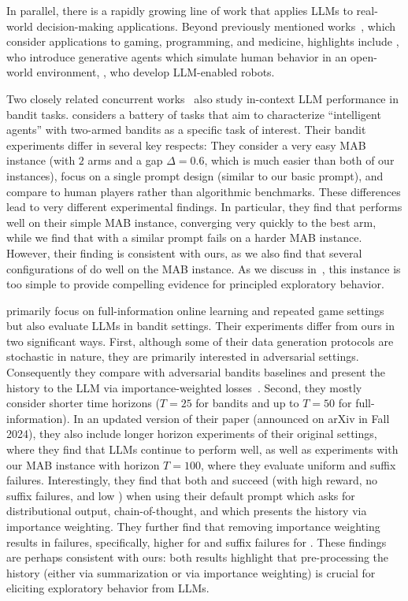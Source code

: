 In parallel, there is a rapidly growing line of work that applies LLMs to real-world decision-making applications. Beyond previously mentioned works~\citep{shinn2023reflexion,wang2023voyager,lee2023ai}, which consider applications to gaming, programming, and medicine, highlights include \citet{park2023generative}, who introduce generative agents which simulate human behavior in an open-world environment, \citet{ahn2022can,xu2023creative}, who develop LLM-enabled robots.



Two closely related concurrent works~\citep{wu2024smartplay,park2024llm} also study in-context LLM performance in bandit tasks.
\citet{wu2024smartplay} considers a battery of tasks that aim to characterize ``intelligent agents'' with two-armed bandits as a specific task of interest.
Their bandit experiments differ in several key respects: They consider a very easy MAB instance (with $2$ arms and a gap $\Delta=0.6$, which is much easier than both of our instances), focus on a single prompt design (similar to our basic prompt), and compare to human players rather than algorithmic benchmarks. These differences lead to very different experimental findings. In particular, they find that \gptfour performs well on their simple MAB instance, converging very quickly to the best arm, while we find that \gptfour with a similar prompt fails on a harder MAB instance. However, their finding is consistent with ours, as we also find that several configurations of \gptfour do well on the \easy MAB instance. As we discuss in~, this instance is too simple to provide compelling evidence for principled exploratory behavior.

\citet{park2024llm} primarily focus on full-information online
learning and repeated game settings but also evaluate LLMs in bandit
settings. Their experiments differ from ours in two significant
ways. First, although some of their data generation protocols are
stochastic in nature, they are primarily interested in adversarial
settings. Consequently they compare with adversarial bandits baselines
and present the history to the LLM via importance-weighted
losses~\citep{bandits-exp3}. Second, they mostly consider shorter time
horizons ($T = 25$ for bandits and up to $T = 50$ for
full-information). In an updated version of their paper (announced on
arXiv in Fall 2024), they also include longer horizon experiments of
their original settings, where they find that LLMs continue to perform
well, as well as experiments with our \hard MAB instance with horizon
$T=100$, where they evaluate uniform and suffix
failures. Interestingly, they find that both \gptfour and \gptfouro
succeed (with high reward, no suffix failures, and low \MinFrac) when
using their default prompt which asks for distributional output,
chain-of-thought, and which presents the history via importance
weighting. They further find that removing importance weighting
results in failures, specifically, higher \MinFrac\xspace for \gptfour
and suffix failures for \gptfouro. These findings are perhaps
consistent with ours: both results highlight that pre-processing the
history (either via summarization or via importance weighting) is
crucial for eliciting exploratory behavior from LLMs.


